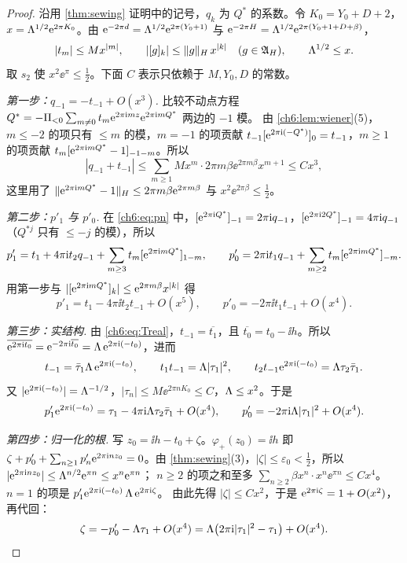 \begin{proof}
沿用 \cref{thm:sewing} 证明中的记号，$q_k$ 为 $Q^*$ 的系数。令 $K_0=Y_0+D+2$，$x=\Lambda^{1/2}\mathrm{e}^{2\pi K_0}$。由 $\mathrm{e}^{-2\pi d}=\Lambda^{1/2}\mathrm{e}^{2\pi(Y_0+1)}$ 与 $\mathrm{e}^{-2\pi H}=\Lambda^{1/2}\mathrm{e}^{2\pi(Y_0+1+D+\beta)}$，
\[
 |t_m|\le Mx^{|m|},\qquad |[g]_k|\le\|g\|_H\,x^{|k|}\quad(g\in\mathfrak A_H),\qquad \Lambda^{1/2}\le x .
\]
取 $s_2$ 使 $x^2\ee^{\pi}\le\tfrac12$。下面 $C$ 表示只依赖于 $M,Y_0,D$ 的常数。

\emph{第一步：$q_{-1}=-t_{-1}+O(x^3)$.} 比较不动点方程 $Q^*=-\Pi_{<0}\sum_{m\ne0}t_m\mathrm{e}^{2\pi\mathrm{i} mz}\mathrm{e}^{2\pi\mathrm{i} mQ^*}$ 两边的 $-1$ 模。
由 \cref{ch6:lem:wiener}(5)，$m\le-2$ 的项只有 $\le m$ 的模，$m=-1$ 的项贡献 $t_{-1}[\mathrm{e}^{2\pi\mathrm{i} (-Q^*)}]_0=t_{-1}$，$m\ge1$ 的项贡献 $t_m[\mathrm{e}^{2\pi\mathrm{i} mQ^*}-1]_{-1-m}$。所以
\[
 |q_{-1}+t_{-1}|\le\sum_{m\ge1}Mx^m\cdot2\pi m\beta\ee^{2\pi m\beta}x^{m+1}\le Cx^3 ,
\]
这里用了 $\|\mathrm{e}^{2\pi\mathrm{i} mQ^*}-1\|_H\le2\pi m\beta\mathrm{e}^{2\pi m\beta}$ 与 $x^2\ee^{2\pi\beta}\le\tfrac12$。

\emph{第二步：$p'_1$ 与 $p'_0$.} 在 \eqref{ch6:eq:pn} 中，$[\mathrm{e}^{2\pi\mathrm{i} Q^*}]_{-1}=2\pi\mathrm{i} q_{-1}$，$[\mathrm{e}^{2\pi\mathrm{i} 2Q^*}]_{-1}=4\pi\mathrm{i} q_{-1}$（$Q^{*j}$ 只有 $\le-j$ 的模），所以
\[
 p'_1=t_1+4\pi\mathrm{i} t_2q_{-1}+\sum_{m\ge3}t_m[\mathrm{e}^{2\pi\mathrm{i} mQ^*}]_{1-m},\qquad
 p'_0=2\pi\mathrm{i} t_1q_{-1}+\sum_{m\ge2}t_m[\mathrm{e}^{2\pi\mathrm{i} mQ^*}]_{-m}.
\]
用第一步与 $|[\mathrm{e}^{2\pi\mathrm{i} mQ^*}]_k|\le\mathrm{e}^{2\pi m\beta}x^{|k|}$ 得
\[
 p'_1=t_1-4\pi\ii t_2t_{-1}+O(x^5),\qquad p'_0=-2\pi\ii t_1t_{-1}+O(x^4).
\]

\emph{第三步：实结构.} 由 \eqref{ch6:eq:Treal}，$t_{-1}=\overline{t_1}$，且 $\overline{t_0}=t_0-\ii h$。所以
$\overline{\mathrm{e}^{2\pi\mathrm{i} t_0}}=\mathrm{e}^{-2\pi\mathrm{i}\overline{t_0}}=\Lambda\,\mathrm{e}^{2\pi\mathrm{i} (-t_0)}$，进而
\[
 t_{-1}=\bar\tau_1\Lambda\,\mathrm{e}^{2\pi\mathrm{i} (-t_0)},\qquad t_1t_{-1}=\Lambda|\tau_1|^2,\qquad t_2t_{-1}\mathrm{e}^{2\pi\mathrm{i} (-t_0)}=\Lambda\tau_2\bar\tau_1 .
\]
又 $|\mathrm{e}^{2\pi\mathrm{i} (-t_0)}|=\Lambda^{-1/2}$，$|\tau_n|\le M\ee^{2\pi nK_0}\le C$，$\Lambda\le x^2$。于是
\[
 p'_1\mathrm{e}^{2\pi\mathrm{i} (-t_0)}=\tau_1-4\pi\mathrm{i}\Lambda\tau_2\bar\tau_1+O(x^4),\qquad p'_0=-2\pi\mathrm{i}\Lambda|\tau_1|^2+O(x^4).
\]

\emph{第四步：归一化的根.} 写 $z_0=\ii h-t_0+\zeta$。$\varphi_+(z_0)=\ii h$ 即
$\zeta+p'_0+\sum_{n\ge1}p'_n\mathrm{e}^{2\pi\mathrm{i} nz_0}=0$。由 \cref{thm:sewing}(3)，$|\zeta|\le\varepsilon_0<\tfrac12$，所以 $|\mathrm{e}^{2\pi\mathrm{i} nz_0}|\le\Lambda^{n/2}\mathrm{e}^{\pi n}\le x^n\mathrm{e}^{\pi n}$；
$n\ge2$ 的项之和至多 $\sum_{n\ge2}\beta x^n\cdot x^n\ee^{\pi n}\le Cx^4$。$n=1$ 的项是 $p'_1\mathrm{e}^{2\pi\mathrm{i} (-t_0)}\,\Lambda\,\mathrm{e}^{2\pi\mathrm{i} \zeta}$。
由此先得 $|\zeta|\le Cx^2$，于是 $\mathrm{e}^{2\pi\mathrm{i} \zeta}=1+O(x^2)$，再代回：
\[
 \zeta=-p'_0-\Lambda\tau_1+O(x^4)=\Lambda\bigl(2\pi\mathrm{i}|\tau_1|^2-\tau_1\bigr)+O(x^4).
\]


\end{proof}

